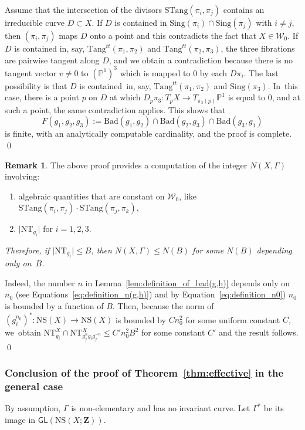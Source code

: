 \documentclass[11pt]{article}
\newcommand{\pp}{\mathbb{P}}\let\P\pp
\def\Z{\mathbf{Z}}
\newcommand{\cW}{\mathcal{W}}
\newcommand{\NS}{{\mathrm{NS}}}
\newcommand{\Sing}{{\mathrm{Sing}}}
\newcommand{\Tang}{{\mathrm{Tang}}}
\newcommand{\STang}{{\mathrm{STang}}}
\newcommand{\NT}{{\mathrm{NT}}}
\newcommand\GL{{\mathsf{GL}}}
\theoremstyle{plain}
\theoremstyle{definition}
\newtheorem{rem}[thm]{Remark}
\numberwithin{equation}{section}
\begin{document}
Assume that the intersection of the divisors $\STang(\pi_i, \pi_j)$ contains an irreducible curve $D\subset X$. If $D$ is contained in $\Sing(\pi_i)\cap \Sing(\pi_j)$ with $i\neq j$, then $(\pi_i, \pi_j)$ maps $D$ onto a point and this contradicts the fact that $X\in { \cW}_0$. If $D$ is contained in, say, $\Tang^{tt}(\pi_1,\pi_2)$
and $\Tang^{tt}(\pi_2, \pi_3)$, the three fibrations are pairwise tangent along $D$, and we obtain a contradiction because there is no tangent vector $v\neq 0$ to $(\pp^1)^3$ which is mapped to $0$ by each $D\pi_i$. The last possibility is that $D$ is contained~in, say, $\Tang^{tt}(\pi_1,\pi_2)$ and $\Sing(\pi_3)$. In~this case, there is a point $p$ on $D$ at which $D_p\pi_3\colon T_pX\to T_{\pi_3(p)}\P^1$ is equal to $0$, and
at such a point, the same contradiction applies. This shows that
\begin{equation}\label{eq:finite-bad-set}
F(g_1,g_2,g_3):=\mathrm{Bad}(g_1,g_2)\cap \mathrm{Bad}(g_2,g_3)\cap \mathrm{Bad}(g_3,g_1)
\end{equation}
is finite, with an analytically computable cardinality, and the proof is complete. \qed

\begin{rem}\label{rem:N(X)}
The above proof provides a computation of the integer $N(X, \Gamma)$ involving:
\begin{enumerate}
\item\label{rem:N(X)1} algebraic quantities that are constant on $\cW_0$, like $\STang(\pi_i,\pi_j)\cdot \STang(\pi_j,\pi_k)$,
\item\label{rem:N(X)2} $\vert \mathrm{NT}_{g_i}\vert$ for
$i=1, 2, 3$.
\end{enumerate}
{\textit{Therefore, if $\vert \mathrm{NT}_{g_i}\vert \leq B$, then $N(X,\Gamma)\leq N(B)$ for some $N(B)$ depending only on~$B$.}}

Indeed, the number $n$ in Lemma~\ref{lem:definition_of_bad(g,h)} depends only on $n_0$ (see Equations~\eqref{eq:definition_n(g,h)}) and by Equation~\eqref{eq:definition_n0}) $n_0$ is bounded by a function of $B$.
Then, because the norm of $(g_i^{n_0})^*\colon \NS(X)\to \NS(X)$ is bounded by $Cn_0^2$ for some uniform constant $C$, we~obtain
$\NT_{g_i}^X \cap \NT_{g_j^ng_ig_j^{-n}}^X\leq C' n_0^2 B^2$
for some constant $C'$ and the result follows. \qed
\end{rem}

\subsubsection*{Conclusion of the proof of Theorem~\ref{thm:effective} in the general case}%
By assumption, $\Gamma$ is non-elementary and has no invariant curve. Let $\Gamma^*$ be its image in $\GL(\NS(X;\Z))$.
\end{document}
